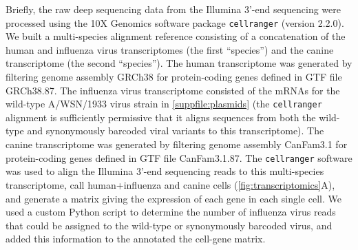 \documentclass[10pt,letterpaper]{article}
\newcommand{\FIG}[1]{\autoref{fig:#1}}
\newcommand{\SUPPFILE}[1]{\autoref{suppfile:#1}}
\begin{document}
Briefly, the raw deep sequencing data from the Illumina 3'-end sequencing were processed using the 10X Genomics software package \texttt{cellranger} (version 2.2.0). 
We built a multi-species alignment reference consisting of a concatenation of the human and influenza virus transcriptomes (the first ``species'') and the canine transcriptome (the second ``species''). 
The human transcriptome was generated by filtering genome assembly GRCh38 for protein-coding genes defined in GTF file GRCh38.87.
The influenza virus transcriptome consisted of the mRNAs for the wild-type A/WSN/1933 virus strain in \SUPPFILE{plasmids} (the \texttt{cellranger} alignment is sufficiently permissive that it aligns sequences from both the wild-type and synonymously barcoded viral variants to this transcriptome).
The canine transcriptome was generated by filtering genome assembly CanFam3.1 for protein-coding genes defined in GTF file CanFam3.1.87.
The \texttt{cellranger} software was used to align the Illumina 3'-end sequencing reads to this multi-species transcriptome, call human+influenza and canine cells (\FIG{transcriptomics}A), and generate a matrix giving the expression of each gene in each single cell.
We used a custom Python script to determine the number of influenza virus reads that could be assigned to the wild-type or synonymously barcoded virus, and added this information to the annotated the cell-gene matrix.
\end{document}
